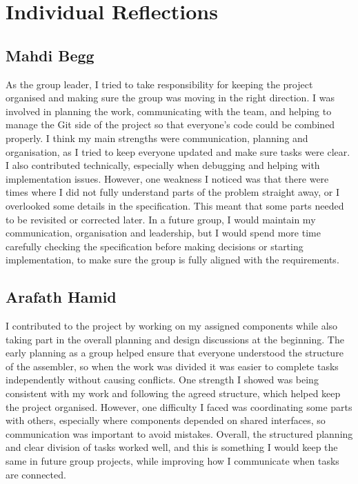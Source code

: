 \documentclass[11pt]{article}
\begin{document}
\section{Individual Reflections}

\subsection*{Mahdi Begg}

As the group leader, I tried to take responsibility for keeping the project organised and making sure the group was moving in the right direction. I was involved in planning the work, communicating with the team, and helping to manage the Git side of the project so that everyone's code could be combined properly. I think my main strengths were communication, planning and organisation, as I tried to keep everyone updated and make sure tasks were clear. I also contributed technically, especially when debugging and helping with implementation issues. However, one weakness I noticed was that there were times where I did not fully understand parts of the problem straight away, or I overlooked some details in the specification. This meant that some parts needed to be revisited or corrected later. In a future group, I would maintain my communication, organisation and leadership, but I would spend more time carefully checking the specification before making decisions or starting implementation, to make sure the group is fully aligned with the requirements.

\subsection*{Arafath Hamid}

I contributed to the project by working on my assigned components while also taking part in the overall planning and design discussions at the beginning. The early planning as a group helped ensure that everyone understood the structure of the assembler, so when the work was divided it was easier to complete tasks independently without causing conflicts. One strength I showed was being consistent with my work and following the agreed structure, which helped keep the project organised. However, one difficulty I faced was coordinating some parts with others, especially where components depended on shared interfaces, so communication was important to avoid mistakes. Overall, the structured planning and clear division of tasks worked well, and this is something I would keep the same in future group projects, while improving how I communicate when tasks are connected.
\end{document}
